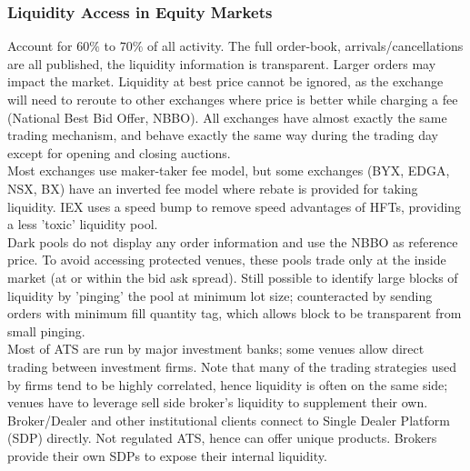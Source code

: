 \subsubsection{Liquidity Access in Equity Markets}

 Account for $60\%$ to $70\%$ of all activity. The full order-book, arrivals/cancellations are all published, the liquidity information is transparent. Larger orders may impact the market. Liquidity at best price cannot be ignored, as the exchange will need to reroute to other exchanges where price is better while charging a fee (National Best Bid Offer, NBBO). All exchanges have almost exactly the same trading mechanism, and behave exactly the same way during the trading day except for opening and closing auctions.\\
Most exchanges use maker-taker fee model, but some exchanges (BYX, EDGA, NSX, BX) have an inverted fee model where rebate is provided for taking liquidity. IEX uses a speed bump to remove speed advantages of HFTs, providing a less 'toxic' liquidity pool.\\

 Dark pools do not display any order information and use the NBBO as reference price. To avoid accessing protected venues, these pools trade only at the inside market (at or within the bid ask spread). Still possible to identify large blocks of liquidity by 'pinging' the pool at minimum lot size; counteracted by sending orders with minimum fill quantity tag, which allows block to be transparent from small pinging.\\
Most of ATS are run by major investment banks; some venues allow direct trading between investment firms. Note that many of the trading strategies used by firms tend to be highly correlated, hence liquidity is often on the same side; venues have to leverage sell side broker's liquidity to supplement their own.\\

 Broker/Dealer and other institutional clients connect to Single Dealer Platform (SDP) directly. Not regulated ATS, hence can offer unique products. Brokers provide their own SDPs to expose their internal liquidity.\\

